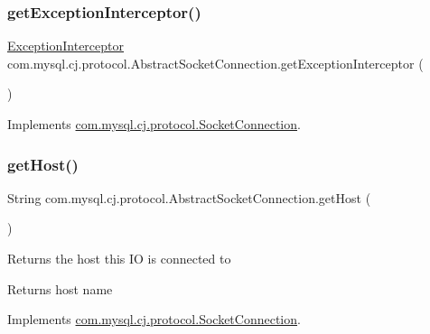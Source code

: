 \subsubsection{\texorpdfstring{get\+Exception\+Interceptor()}{getExceptionInterceptor()}}
{\footnotesize\ttfamily \mbox{\hyperlink{interfacecom_1_1mysql_1_1cj_1_1exceptions_1_1_exception_interceptor}{Exception\+Interceptor}} com.\+mysql.\+cj.\+protocol.\+Abstract\+Socket\+Connection.\+get\+Exception\+Interceptor (\begin{DoxyParamCaption}{ }\end{DoxyParamCaption})}



Implements \mbox{\hyperlink{interfacecom_1_1mysql_1_1cj_1_1protocol_1_1_socket_connection_a4d5027b36a3d4147c685c2a3326fd153}{com.\+mysql.\+cj.\+protocol.\+Socket\+Connection}}.

\mbox{\label{classcom_1_1mysql_1_1cj_1_1protocol_1_1_abstract_socket_connection_a71d1b8dda2033fdf3c7a9715f0e64414}} 
\subsubsection{\texorpdfstring{get\+Host()}{getHost()}}
{\footnotesize\ttfamily String com.\+mysql.\+cj.\+protocol.\+Abstract\+Socket\+Connection.\+get\+Host (\begin{DoxyParamCaption}{ }\end{DoxyParamCaption})}

Returns the host this IO is connected to

\begin{DoxyReturn}{Returns}
host name 
\end{DoxyReturn}


Implements \mbox{\hyperlink{interfacecom_1_1mysql_1_1cj_1_1protocol_1_1_socket_connection_a1fa2cc5cddf0b92a9f19472924aa6e61}{com.\+mysql.\+cj.\+protocol.\+Socket\+Connection}}.

\mbox{\label{classcom_1_1mysql_1_1cj_1_1protocol_1_1_abstract_socket_connection_acb0fa6da1b08c40358e83dbc1e8867e7}} 
